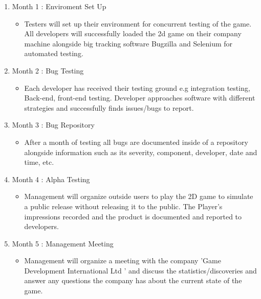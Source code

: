 \begin{enumerate}
   \item Month 1    : Enviroment Set Up 
   \begin{itemize}
     \item Testers will set up their environment for concurrent testing of the game. All developers will successfully loaded the 2d game on their company machine alongside big tracking software Bugzilla and Selenium for automated testing.
  
   \end{itemize}
  
  \item Month 2  : Bug Testing
   \begin{itemize}
     \item Each developer has received their testing ground e.g integration testing, Back-end, front-end testing. Developer approaches software with different strategies and successfully finds issues/bugs to report.
   \end{itemize}

     \item Month 3   : Bug Repository
   \begin{itemize}
     \item After a month of testing all bugs are documented inside of a repository alongside information such as its severity, component, developer, date and time, etc.

  
   \end{itemize}



 \item Month 4  : Alpha Testing
   \begin{itemize}
 	\item Management will organize outside users to play the  2D game to simulate a public release without releasing it to the public. The Player's impressions recorded and the product is documented and reported to developers.

 	 \end{itemize}



 \item Month 5 : Management Meeting
   \begin{itemize}
  \item Management will organize a meeting with the company 'Game Development International Ltd ' and discuss the statistics/discoveries and answer any questions the company has about the current state of the game.

   \end{itemize}

 	 \end{enumerate}
